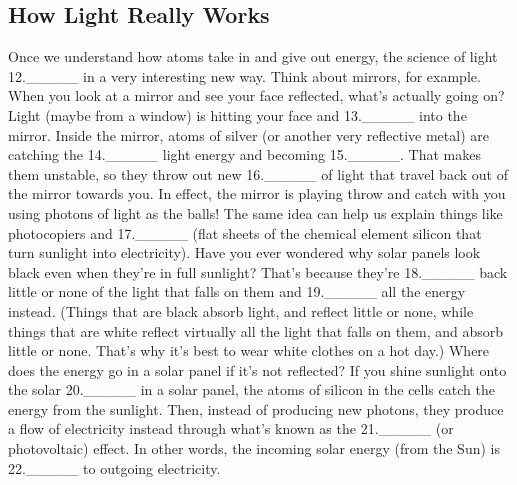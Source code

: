 \subsection*{How Light Really Works}
Once we understand how atoms take in and give out energy, the science of light 12.\_\_\_\_\_
in a very interesting new way. Think about mirrors, for example. When you look at a mirror and see
your face reflected, what's actually going on? Light (maybe from a window) is hitting your face and
13.\_\_\_\_\_ into the mirror. Inside the mirror, atoms of silver (or another very reflective
metal) are catching the 14.\_\_\_\_\_ light energy and becoming 15.\_\_\_\_\_. That makes
them unstable, so they throw out new 16.\_\_\_\_\_ of light that travel back out of the mirror
towards you. In effect, the mirror is playing throw and catch with you using photons of light as the
balls!
The same idea can help us explain things like photocopiers and 17.\_\_\_\_\_ (flat sheets of the
chemical element silicon that turn sunlight into electricity). Have you ever wondered why solar
panels look black even when they're in full sunlight? That's because they're 18.\_\_\_\_\_ back
little or none of the light that falls on them and 19.\_\_\_\_\_ all the energy instead. (Things that
are black absorb light, and reflect little or none, while things that are white reflect virtually all the
light that falls on them, and absorb little or none. That's why it's best to wear white clothes on a hot
day.) Where does the energy go in a solar panel if it's not reflected? If you shine sunlight onto the
solar 20.\_\_\_\_\_ in a solar panel, the atoms of silicon in the cells catch the energy from the
sunlight. Then, instead of producing new photons, they produce a flow of electricity instead through
what's known as the 21.\_\_\_\_\_ (or photovoltaic) effect. In other words, the incoming solar
energy (from the Sun) is 22.\_\_\_\_\_ to outgoing electricity.

